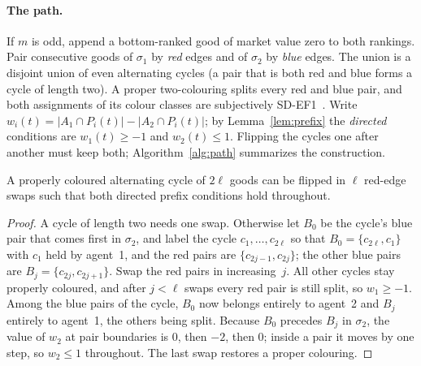\documentclass[sigconf,anonymous]{aamas}
\begin{document}
\paragraph{The path.} If $m$ is odd, append a bottom-ranked good of market value zero to both rankings. Pair consecutive goods of $\sigma_1$ by \emph{red} edges and of $\sigma_2$ by \emph{blue} edges. The union is a disjoint union of even alternating cycles (a pair that is both red and blue forms a cycle of length two). A proper two-colouring splits every red and blue pair, and both assignments of its colour classes are subjectively SD-EF1~\citep{kyropoulou2020group}. Write $w_i(t)=|A_1\cap P_i(t)|-|A_2\cap P_i(t)|$; by Lemma~\ref{lem:prefix} the \emph{directed} conditions are $w_1(t)\ge-1$ and $w_2(t)\le1$. Flipping the cycles one after another must keep both; Algorithm~\ref{alg:path} summarizes the construction.

\begin{lemma}\label{lem:flip}
A properly coloured alternating cycle of $2\ell$ goods can be flipped in $\ell$ red-edge swaps such that both directed prefix conditions hold throughout.
\end{lemma}
\begin{proof}
A cycle of length two needs one swap. Otherwise let $B_0$ be the cycle's blue pair that comes first in $\sigma_2$, and label the cycle $c_1,\dots,c_{2\ell}$ so that $B_0=\{c_{2\ell},c_1\}$ with $c_1$ held by agent~1, and the red pairs are $\{c_{2j-1},c_{2j}\}$; the other blue pairs are $B_j=\{c_{2j},c_{2j+1}\}$. Swap the red pairs in increasing~$j$. All other cycles stay properly coloured, and after $j<\ell$ swaps every red pair is still split, so $w_1\ge-1$. Among the blue pairs of the cycle, $B_0$ now belongs entirely to agent~2 and $B_j$ entirely to agent~1, the others being split. Because $B_0$ precedes $B_j$ in $\sigma_2$, the value of $w_2$ at pair boundaries is $0$, then $-2$, then $0$; inside a pair it moves by one step, so $w_2\le1$ throughout. The last swap restores a proper colouring.
\end{proof}
\end{document}
